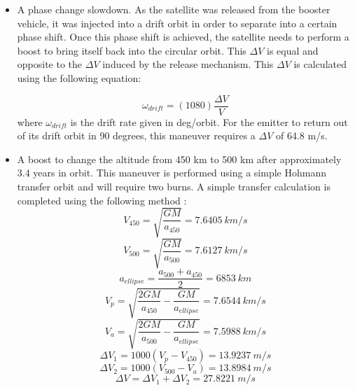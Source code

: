 \begin{itemize}
	\item A phase change slowdown. As the satellite was released from the booster vehicle, it was injected into a drift orbit in order to separate into a certain phase shift. Once this phase shift is achieved, the satellite needs to perform a boost to bring itself back into the circular orbit. This $\Delta V$ is equal and opposite to the $\Delta V$ induced by the release mechanism. This $\Delta V$ is calculated using the following equation:
	
		\begin{equation} 
 			\omega _{drift} = (1080)\frac{\Delta V}{V} 
		\end{equation}
	where $\omega _{drift}$ is the drift rate given in deg/orbit. For the emitter to return out of its drift orbit in 90 degrees, this maneuver requires a $\Delta V$ of 64.8 m/s.
	\item A boost to change the altitude from 450 km to 500 km after approximately 3.4 years in orbit. This maneuver is performed using a simple Hohmann transfer orbit and will require two burns. A simple transfer calculation is completed using the following method \cite{spacedesign}:
	\begin{equation} 
 			V_{450} = \sqrt{\frac{GM}{a_{450}}} =  7.6405\ km/s
		\end{equation}
		\begin{equation} 
 			V_{500} = \sqrt{\frac{GM}{a_{500}}} = 7.6127\ km/s
		\end{equation}
		\begin{equation}
			a_{ellipse} = \frac{a_{500}+a_{450}}{2} = 6853\ km
		\end{equation}
		\begin{equation} 
 			V_{p} = \sqrt{\frac{2GM}{a_{450}}-\frac{GM}{a_{ellipse}}} = 7.6544\ km/s
		\end{equation}
		\begin{equation} 
 			V_{a} = \sqrt{\frac{2GM}{a_{500}}-\frac{GM}{a_{ellipse}}} = 7.5988\ km/s
		\end{equation}
			\begin{equation}
			\Delta V_1 = 1000(V_p - V_{450}) = 13.9237\ m/s
		\end{equation}
		\begin{equation}
			\Delta V_2 = 1000(V_{500} - V_a) = 13.8984\ m/s
		\end{equation}
		\begin{equation}
			\Delta V = \Delta V_1 + \Delta V_2 = 27.8221\ m/s
		\end{equation}
		

\end{itemize}
